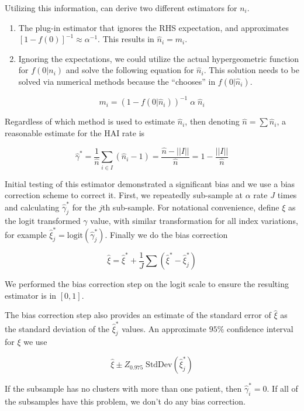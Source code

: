 \documentclass[]{article}
\providecommand{\tightlist}{%
  \setlength{\itemsep}{0pt}\setlength{\parskip}{0pt}}
\begin{document}
Utilizing this information, can derive two different estimators for
\(n_i\).

\begin{enumerate}
\def\labelenumi{\arabic{enumi}.}
\tightlist
\item
  The plug-in estimator that ignores the RHS expectation, and
  approximates \(\left[ 1-f(0)\right]^{-1} \approx \alpha^{-1}\). This
  results in \(\widehat{n}_i = m_i\).
\item
  Ignoring the expectations, we could utilize the actual hypergeometric
  function for \(f(0|n_i)\) and solve the following equation for
  \(\widehat{n}_i\). This solution needs to be solved via numerical
  methods because the ``chooses'' in \(f(0|\widehat{n}_i)\).
\end{enumerate}

\[m_i =  (1-f(0|\widehat{n}_i))^{-1} \;\alpha \; \widehat{n}_i\]

Regardless of which method is used to estimate \(\hat{n}_i\), then
denoting \(\hat{n} = \sum\hat{n}_i\), a reasonable estimate for the HAI
rate is

\[\hat{\gamma}^* = \frac{1}{\hat{n}}\sum_{i\in I} (\hat{n}_i-1) = \frac{\hat{n} - ||I||}{\hat{n}} = 1-\frac{||I||}{\hat{n}}\]

Initial testing of this estimator demonstrated a significant bias and we
use a bias correction scheme to correct it. First, we repeatedly
sub-sample at \(\alpha\) rate \(J\) times and calculating
\(\hat{\gamma}^*_j\) for the \(j\)th sub-sample. For notational
convenience, define \(\xi\) as the logit transformed \(\gamma\) value,
with similar transformation for all index variations, for example
\(\hat{\xi}^*_j = \textrm{logit}(\hat{\gamma}^*_j)\). Finally we do the
bias correction

\[\hat{\xi} = \hat{\xi}^*  + \frac{1}{J}\sum\left( \hat\xi^* - \hat\xi^*_j \right)\]

We performed the bias correction step on the logit scale to ensure the
resulting estimator is in \([0,1]\).

The bias correction step also provides an estimate of the standard error
of \(\hat{\xi}\) as the standard deviation of the \(\hat\xi^*_j\)
values. An approximate \(95\%\) confidence interval for \(\xi\) we use

\[\hat{\xi} \pm Z_{0.975} \; \textrm{StdDev}( \hat\xi^*_j )\]

If the subsample has no clusters with more than one patient, then
\(\hat\gamma^*_i = 0\). If all of the subsamples have this problem, we
don't do any bias correction.
\end{document}
